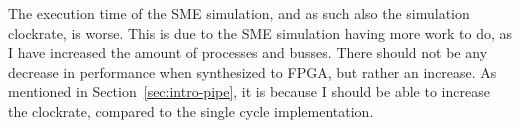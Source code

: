 The execution time of the SME simulation, and as such also the simulation
clockrate, is worse. This is due to the SME simulation having more work to do,
as I have increased the amount of processes and busses. There should not be any
decrease in performance when synthesized to FPGA, but rather an increase.
As mentioned in Section~\ref{sec:intro-pipe}, it is because I should be able
to increase the clockrate, compared to the single cycle implementation.
